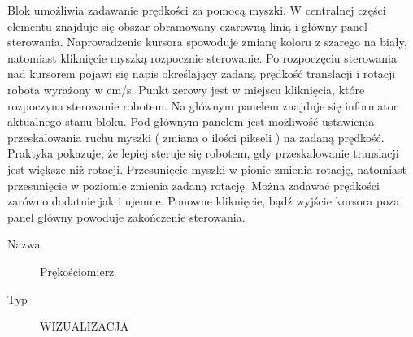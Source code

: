 \documentclass[eng,printmode]{mgr}
\begin{document}
Blok umożliwia zadawanie prędkości za pomocą myszki. W centralnej części elementu znajduje się obszar obramowany czarowną linią i główny panel sterowania. Naprowadzenie kursora spowoduje zmianę koloru z szarego na biały, natomiast kliknięcie myszką rozpocznie sterowanie. Po rozpoczęciu sterowania nad kursorem pojawi się napis określający zadaną prędkość translacji i rotacji robota wyrażony w cm/s. Punkt zerowy jest w miejscu kliknięcia, które rozpoczyna sterowanie robotem. Na głównym panelem znajduje się informator aktualnego stanu bloku. Pod głównym panelem jest możliwość ustawienia przeskalowania ruchu myszki ( zmiana o ilości pikseli ) na zadaną prędkość. Praktyka pokazuje, że lepiej steruje się robotem, gdy przeskalowanie translacji jest większe niż rotacji.  Przesunięcie myszki w pionie zmienia rotację, natomiast przesunięcie w poziomie zmienia zadaną rotację. Można zadawać prędkości zarówno dodatnie jak i ujemne. Ponowne kliknięcie, bądź wyjście kursora poza panel główny powoduje zakończenie sterowania.
\newpage
\begin{description}
  \item[Nazwa] Prękościomierz
  \item[Typ] WIZUALIZACJA
\end{description}
\end{document}
